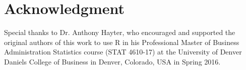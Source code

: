 %
%
%
%
%

\section{Acknowledgment}

Special thanks to Dr. Anthony Hayter, who encouraged and supported the 
original authors of this work to use R in his Professional Master of 
Business Administration Statistics course (STAT 4610-17) at the 
University of Denver Daniels College of Business in Denver, Colorado, 
USA in Spring 2016.
